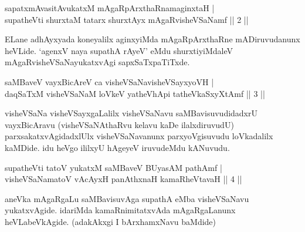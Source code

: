 \begin{shl}
sapatxmAvasitAvukatxM mAgaRpArxthaRnamaginxtaH | \\
supatheVti shurxtaM tatarx shurxtAyx mAgaRvisheVSaNamf \hfill|| 2 || 
\end{shl}

\begin{artha}
ELane adhAyxyada koneyalilx aginxyiMda mAgaRpArxthaRne mADiru\-vudanunx 
heVLide. `agenxV naya supathA rAyeV' eMdu shurxtiyiMdaleV mAgaRvisheVSaNayukatxvAgi sapxSaTxpaTiTxde.
\end{artha}


\begin{shl}
\footnotemark[1]saMBaveV vayxBicAreV ca visheVSaNavisheVSayxyoVH | \\
daqSaTxM visheVSaNaM loVkeV yatheVhApi tatheVkaSxyXtAmf \hfill|| 3 || 
\end{shl}

\begin{artha}
visheVSaNa visheVSayxgaLalilx visheVSaNavu saMBavisuvudidadxrU 
vayxBicAravu (visheVSaNAthaRvu kelavu kaDe ilalxdiruvudU) 
parxsakatxvAgidadxlUlx visheVSaNavanunx parxyoVgisuvudu loVkadalilx 
kaMDide. idu heVgo ililxyU hAgeyeV iruvudeMdu kANuvudu.
\end{artha}


\begin{shl}
supatheVti tatoV yukatxM saMBaveV BUyasAM pathAmf | \\
visheVSaNamatoV vAcAyxH panAthxnaH kamaRheVtavaH \hfill|| 4 || 
\end{shl}

\begin{artha}
aneVka mAgaRgaLu saMBavisuvAga supathA eMba visheVSaNavu yukatxvAgide. 
idariMda kamaRnimitatxvAda mAgaRgaLanunx heVLabeVkAgide. (adakAkxgi I 
bArxhamxNavu baMdide)
\end{artha}

